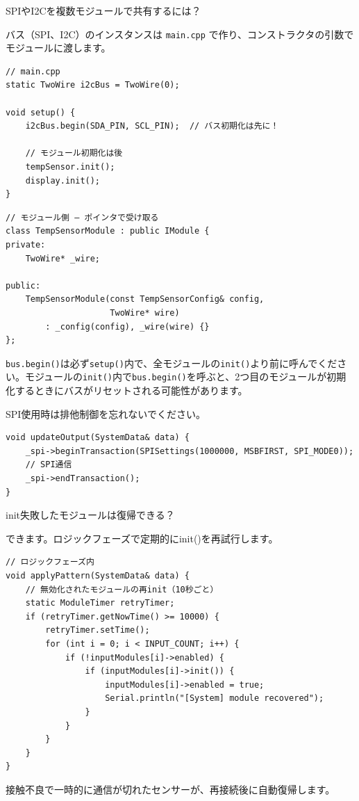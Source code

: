 \begin{qabox}{SPIやI2Cを複数モジュールで共有するには？}

バス（SPI、I2C）のインスタンスは \texttt{main.cpp} で作り、コンストラクタの引数でモジュールに渡します。

\begin{lstlisting}
// main.cpp
static TwoWire i2cBus = TwoWire(0);

void setup() {
    i2cBus.begin(SDA_PIN, SCL_PIN);  // バス初期化は先に！

    // モジュール初期化は後
    tempSensor.init();
    display.init();
}
\end{lstlisting}

\begin{lstlisting}
// モジュール側 — ポインタで受け取る
class TempSensorModule : public IModule {
private:
    TwoWire* _wire;

public:
    TempSensorModule(const TempSensorConfig& config,
                     TwoWire* wire)
        : _config(config), _wire(wire) {}
};
\end{lstlisting}

\begin{cautionbox}[バス初期化の順番]
\texttt{bus.begin()}は必ず\texttt{setup()}内で、全モジュールの\texttt{init()}より前に呼んでください。モジュールの\texttt{init()}内で\texttt{bus.begin()}を呼ぶと、2つ目のモジュールが初期化するときにバスがリセットされる可能性があります。
\end{cautionbox}

SPI使用時は排他制御を忘れないでください。

\begin{lstlisting}
void updateOutput(SystemData& data) {
    _spi->beginTransaction(SPISettings(1000000, MSBFIRST, SPI_MODE0));
    // SPI通信
    _spi->endTransaction();
}
\end{lstlisting}

\end{qabox}

\begin{qabox}{init失敗したモジュールは復帰できる？}

できます。ロジックフェーズで定期的にinit()を再試行します。

\begin{lstlisting}
// ロジックフェーズ内
void applyPattern(SystemData& data) {
    // 無効化されたモジュールの再init（10秒ごと）
    static ModuleTimer retryTimer;
    if (retryTimer.getNowTime() >= 10000) {
        retryTimer.setTime();
        for (int i = 0; i < INPUT_COUNT; i++) {
            if (!inputModules[i]->enabled) {
                if (inputModules[i]->init()) {
                    inputModules[i]->enabled = true;
                    Serial.println("[System] module recovered");
                }
            }
        }
    }
}
\end{lstlisting}

接触不良で一時的に通信が切れたセンサーが、再接続後に自動復帰します。

\end{qabox}

